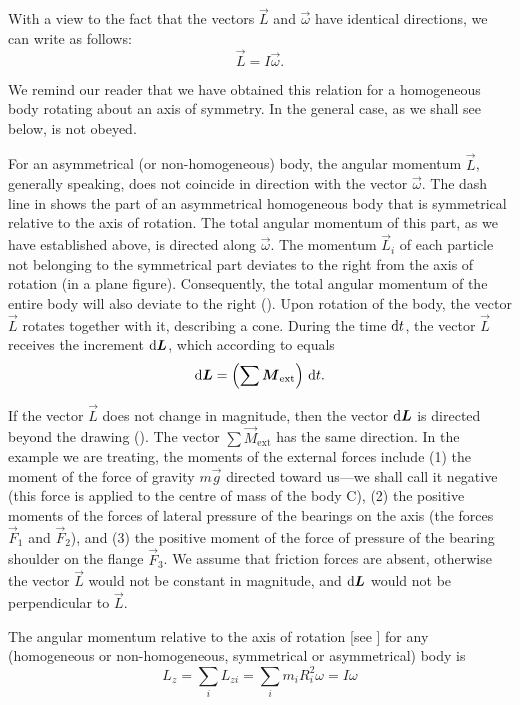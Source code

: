 With a view to the fact that the vectors $\vec{L}$ and $\vec{\omega}$ have identical directions, we can write  as follows:
\begin{equation}\label{eq:5_12}
\vec{L} = I \vec{\omega}.
\end{equation}

\noindent
We remind our reader that we have obtained this relation for a homogeneous body rotating about an axis of symmetry. In the general case, as we shall see below,  is not obeyed.

For an asymmetrical (or non-homogeneous) body, the angular momentum $\vec{L}$, generally speaking, does not coincide in direction with the vector $\vec{\omega}$. The dash line in  shows the part of an asymmetrical homogeneous body that is symmetrical relative to the axis of rotation. The total angular momentum of this part, as we have established above, is directed along $\vec{\omega}$. The momentum $\vec{L}_i$ of each particle not belonging to the symmetrical part deviates to the right from the axis of rotation (in a plane figure). Consequently, the total angular momentum of the entire body will also deviate to the right (). Upon rotation of the body, the vector $\vec{L}$ rotates together with it, describing a cone. During the time $\mathrm{d} t$, the vector $\vec{L}$ receives the increment $\mathrm{d}\boldsymbol{L}$, which according to  equals
\begin{equation}\label{eq:5_13}
\mathrm{d}\boldsymbol{L} = \left( \sum \boldsymbol{M}_{\text{ext}} \right) \, \mathrm{d} t.
\end{equation}

\noindent
If the vector $\vec{L}$ does not change in magnitude, then the vector $\mathrm{d}\boldsymbol{L}$ is directed beyond the drawing (). The vector $\sum\vec{M}_{\text{ext}}$ has the same direction. In the example we are treating, the moments of the external forces include (1) the moment of the force of gravity $m\vec{g}$ directed toward us---we shall call it negative (this force is applied to the centre of mass of the body C), (2) the positive moments of the forces of lateral pressure of the bearings on the axis (the forces $\vec{F}_1$ and $\vec{F}_2$), and (3) the positive moment of the force of pressure of the bearing shoulder on the flange $\vec{F}_3$. We assume that friction forces are absent, otherwise the vector $\vec{L}$ would not be constant in magnitude, and $\mathrm{d}\boldsymbol{L}$ would not be perpendicular to $\vec{L}$.

The angular momentum relative to the axis of rotation [see ] for any (homogeneous or non-homogeneous, symmetrical or asymmetrical) body is
\begin{equation}\label{eq:5_14}
L_z = \sum_i L_{zi} = \sum_i m_i R_i^2 \omega = I \omega
\end{equation}

